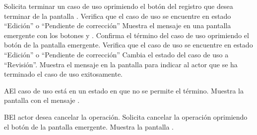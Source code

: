  \begin{UCtrayectoria}
    \UCpaso[\UCactor] Solicita terminar un caso de uso oprimiendo el botón \btnTerminar del registro que desea terminar de la pantalla .
    \UCpaso[\UCsist] Verifica que el caso de uso se encuentre en estado ``Edición'' o ``Pendiente de corrección'' 
    \UCpaso[\UCsist] Muestra el mensaje  en una pantalla emergente con los botones  y .
    \UCpaso[\UCactor] Confirma el término del caso de uso oprimiendo el botón  de la pantalla emergente. 
    \UCpaso[\UCsist] Verifica que el caso de uso se encuentre en estado ``Edición'' o ``Pendiente de corrección'' 
    \UCpaso[\UCsist] Cambia el estado del caso de uso a ``Revisión''.
    \UCpaso[\UCsist] Muestra el mensaje  en la pantalla 
    para indicar al actor que se ha terminado el caso de uso exitosamente.
 \end{UCtrayectoria}
 
 \begin{UCtrayectoriaA}{A}{El caso de uso está en un estado en que no se permite el término.}
    \UCpaso[\UCsist] Muestra la pantalla  con el mensaje .
 \end{UCtrayectoriaA} 

 \begin{UCtrayectoriaA}{B}{El actor desea cancelar la operación.}
    \UCpaso[\UCactor] Solicita cancelar la operación oprimiendo el botón  de la pantalla emergente.
    \UCpaso[\UCsist] Muestra la pantalla .
 \end{UCtrayectoriaA} 